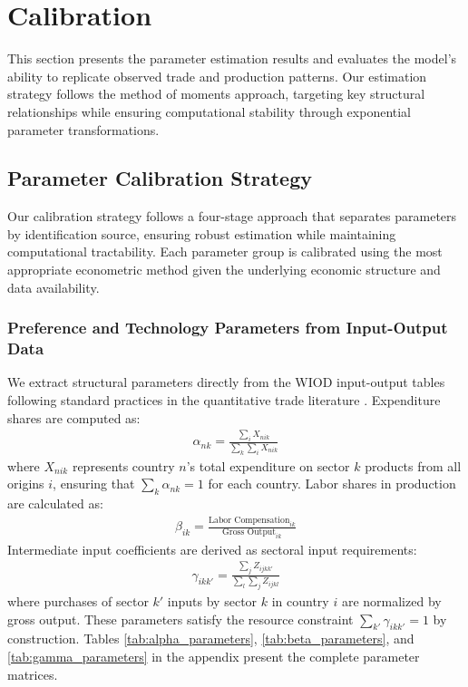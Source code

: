 \section{Calibration}

This section presents the parameter estimation results and evaluates the model's ability to replicate observed trade and production patterns. Our estimation strategy follows the method of moments approach, targeting key structural relationships while ensuring computational stability through exponential parameter transformations.

\subsection{Parameter Calibration Strategy}

Our calibration strategy follows a four-stage approach that separates parameters by identification source, ensuring robust estimation while maintaining computational tractability. Each parameter group is calibrated using the most appropriate econometric method given the underlying economic structure and data availability.

\subsubsection{Preference and Technology Parameters from Input-Output Data}

We extract structural parameters directly from the WIOD input-output tables following standard practices in the quantitative trade literature \citep{costinot2012TheReviewofEconomicStudies}. Expenditure shares are computed as:
\begin{align*}
\alpha_{nk} = \frac{\sum_i X_{nik}}{\sum_k \sum_i X_{nik}}
\end{align*}
where $X_{nik}$ represents country $n$'s total expenditure on sector $k$ products from all origins $i$, ensuring that $\sum_k \alpha_{nk} = 1$ for each country. Labor shares in production are calculated as:
\begin{align*}
\beta_{ik} = \frac{\text{Labor Compensation}_{ik}}{\text{Gross Output}_{ik}}
\end{align*}
Intermediate input coefficients are derived as sectoral input requirements:
\begin{align*}
\gamma_{ikk'} = \frac{\sum_j Z_{ijkk'}}{\sum_{l}\sum_j Z_{ijkl}}
\end{align*}
where purchases of sector $k'$ inputs by sector $k$ in country $i$ are normalized by gross output. These parameters satisfy the resource constraint $\sum_{k'} \gamma_{ikk'} = 1$ by construction. Tables \ref{tab:alpha_parameters}, \ref{tab:beta_parameters}, and \ref{tab:gamma_parameters} in the appendix present the complete parameter matrices.

